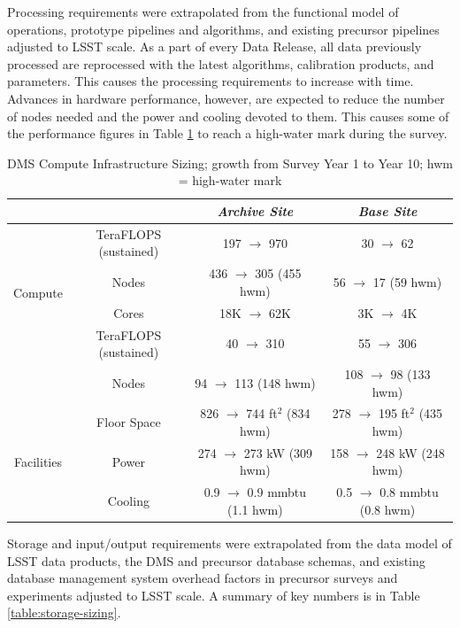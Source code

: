 Processing requirements were extrapolated from the functional model of
operations, prototype pipelines and algorithms, and existing precursor
pipelines adjusted to LSST scale.  As a part of every Data Release, all data
previously processed are reprocessed with the latest algorithms, calibration
products, and parameters. This causes the processing requirements to increase
with time.  Advances in hardware performance, however, are expected to reduce
the number of nodes needed and the power and cooling devoted to them. This causes some of the performance figures in Table \ref{table:compute-sizing} to reach
a high-water mark during the survey.

\centering
\begin{longtable}{|c|c|c|c|}
\caption{DMS Compute Infrastructure Sizing; growth from Survey Year 1 to Year 10; hwm = high-water mark \label{table:compute-sizing}}\\   %
 \hline
	& & \textit{Archive Site} & \textit{Base Site} \\ \hline
\multirow{4}{*}{Compute} & TeraFLOPS (sustained) & 197 $\rightarrow$ 970 & 30 $\rightarrow$ 62 \\ \cline{2-4}
  & Nodes & 436 $\rightarrow$ 305 (455 hwm) & 56 $\rightarrow$ 17 (59 hwm) \\ \cline{2-4}
  & Cores & 18K $\rightarrow$ 62K & 3K $\rightarrow$ 4K \\ \hline
\multirow{2}{*}{Database} & TeraFLOPS (sustained) & 40 $\rightarrow$ 310 & 55 $\rightarrow$ 306 \\ \cline{2-4}
  & Nodes & 94 $\rightarrow$ 113 (148 hwm) & 108 $\rightarrow$ 98 (133 hwm) \\ \cline{2-4}
\multirow{3}{*}{Facilities} & Floor Space & 826 $\rightarrow$ 744 ft$^2$ (834 hwm) & 278 $\rightarrow$ 195 ft$^2$ (435 hwm) \\ \cline{2-4}
  & Power & 274 $\rightarrow$ 273 kW (309 hwm) & 158 $\rightarrow$ 248 kW (248 hwm) \\ \cline{2-4}
  & Cooling & 0.9 $\rightarrow$ 0.9 mmbtu (1.1 hwm) & 0.5 $\rightarrow$ 0.8 mmbtu (0.8 hwm) \\ \hline
\end{longtable}

Storage and input/output requirements were extrapolated from the data model of
LSST data products, the DMS and precursor database schemas, and
existing database management system overhead factors in precursor
surveys and experiments adjusted to LSST scale. A summary of key numbers is
in Table \ref{table:storage-sizing}.


